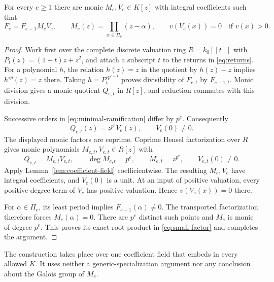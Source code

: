 \begin{lemma}\label{lem:small-factor}
For every $e\ge1$ there are monic $M_e,V_e\in K[z]$ with integral
coefficients such that
\begin{equation}\label{eq:small-factor}
 F_e=F_{e-1}M_eV_e,\qquad
 M_e(z)=\prod_{\alpha\in\Pi_e}(z-\alpha),\qquad
 v(V_e(x))=0\quad\text{if }v(x)>0.
\end{equation}
\end{lemma}
\begin{proof}
Work first over the complete discrete valuation ring $R=k_0[[t]]$
with $P_t(z)=(1+t)z+z^2$, and attach a subscript $t$ to the returns
in \eqref{eq:returns}. For a polynomial $h$, the relation $h(z)=z$
in the quotient by $h(z)-z$ implies $h^{\circ p}(z)=z$ there.
Taking $h=P_t^{\circ p^{e-1}}$ proves divisibility of $F_{e,t}$ by
$F_{e-1,t}$. Monic division gives a monic quotient $Q_{e,t}$ in
$R[z]$, and reduction commutes with this division.

Successive orders in \eqref{eq:minimal-ramification} differ by
$p^e$. Consequently
\[
 \overline Q_{e,t}(z)=z^{p^e}\overline V_e(z),
 \qquad \overline V_e(0)\ne0.
\]
The displayed monic factors are coprime. Coprime Hensel factorization
over $R$ gives monic polynomials $M_{e,t},V_{e,t}\in R[z]$ with
\[
 Q_{e,t}=M_{e,t}V_{e,t},\qquad
 \deg M_{e,t}=p^e,\qquad
 \overline M_{e,t}=z^{p^e},\qquad
 \overline V_{e,t}(0)\ne0.
\]
Apply Lemma~\ref{lem:coefficient-field} coefficientwise. The resulting
$M_e,V_e$ have integral coefficients, and $V_e(0)$ is a unit.
At an input of positive valuation, every positive-degree term of
$V_e$ has positive valuation. Hence $v(V_e(x))=0$ there.

For $\alpha\in\Pi_e$, its least period implies
$F_{e-1}(\alpha)\ne0$. The transported factorization therefore
forces $M_e(\alpha)=0$. There are $p^e$ distinct such points and
$M_e$ is monic of degree $p^e$. This proves its exact root product
in \eqref{eq:small-factor} and completes the argument.
\end{proof}

The construction takes place over one coefficient field that embeds
in every allowed $K$. It uses neither a generic-specialization
argument nor any conclusion about the Galois group of $M_e$.
